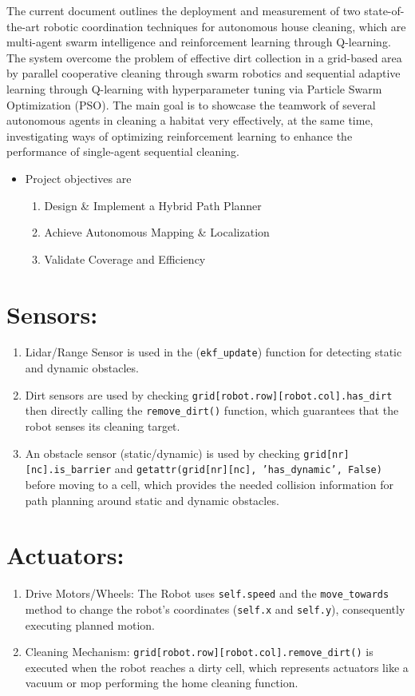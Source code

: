 \documentclass[12pt,a4paper]{report}
\begin{document}
The current document outlines the deployment and measurement of two state-of-the-art robotic coordination techniques for autonomous house cleaning, which are multi-agent swarm intelligence and reinforcement learning through Q-learning. The system overcome the problem of effective dirt collection in a grid-based area by parallel cooperative cleaning through swarm robotics and sequential adaptive learning through Q-learning with hyperparameter tuning via Particle Swarm Optimization (PSO). The main goal is to showcase the teamwork of several autonomous agents in cleaning a habitat very effectively, at the same time, investigating ways of optimizing reinforcement learning to enhance the performance of single-agent sequential cleaning.

  \begin{itemize}
    \item Project objectives are
    \begin{enumerate}
        \item Design \& Implement a Hybrid Path Planner
        \item Achieve Autonomous Mapping \& Localization
        \item Validate Coverage and Efficiency
    \end{enumerate}
\end{itemize}
    \section*{Sensors:}
\begin{enumerate}
    \item Lidar/Range Sensor is used in the (\texttt{ekf\_update}) function for detecting static and dynamic obstacles.
    \item Dirt sensors are used by checking \texttt{grid[robot.row][robot.col].has\_dirt} then directly calling the \texttt{remove\_dirt()} function, which guarantees that the robot senses its cleaning target.
    \item An obstacle sensor (static/dynamic) is used by checking \texttt{grid[nr][nc].is\_barrier} and \texttt{getattr(grid[nr][nc], 'has\_dynamic', False)} before moving to a cell, which provides the needed collision information for path planning around static and dynamic obstacles.
\end{enumerate}
\section*{Actuators:}
\begin{enumerate}
    \item Drive Motors/Wheels: The Robot uses \texttt{self.speed} and the \texttt{move\_towards} method to change the robot's coordinates (\texttt{self.x} and \texttt{self.y}), consequently executing planned motion.
    \item Cleaning Mechanism: \texttt{grid[robot.row][robot.col].remove\_dirt()} is executed when the robot reaches a dirty cell, which represents actuators like a vacuum or mop performing the home cleaning function.
\end{enumerate}
\end{document}
